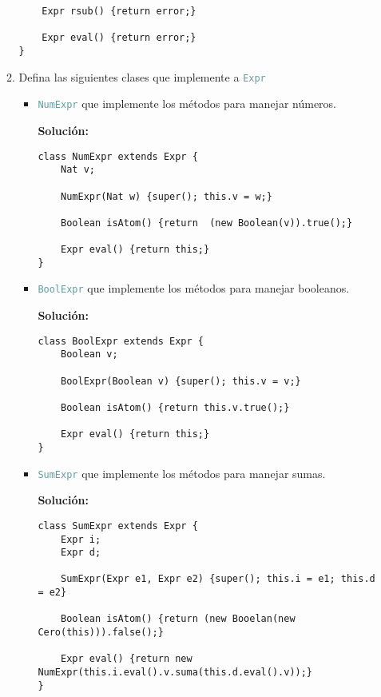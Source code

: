 \documentclass{article}
\newcommand{\tp}[1]{\textcolor{CadetBlue} {\texttt{#1}}}
\newcommand{\tb}[1]{\textcolor{RoyalPurple} {\textbf{#1}}}
\begin{document}
\begin{enumerate}
\begin{enumerate}
\begin{verbatim}
    Expr rsub() {return error;}

    Expr eval() {return error;}
}
            \end{verbatim}

            \item Defina las siguientes clases que implemente a \tp{Expr}

            \begin{itemize}
                \item \tp{NumExpr} que implemente los métodos para manejar
                números.

                \tb{Solución:}

                \begin{verbatim}
class NumExpr extends Expr {
    Nat v;

    NumExpr(Nat w) {super(); this.v = w;}

    Boolean isAtom() {return  (new Boolean(v)).true();}

    Expr eval() {return this;}
}
                \end{verbatim}

                \item \tp{BoolExpr} que implemente los métodos para manejar
                booleanos.

                \tb{Solución:}

                \begin{verbatim}
class BoolExpr extends Expr {
    Boolean v;

    BoolExpr(Boolean v) {super(); this.v = v;}

    Boolean isAtom() {return this.v.true();}

    Expr eval() {return this;}
}
                \end{verbatim}

                \item \tp{SumExpr} que implemente los métodos para manejar
                sumas.

                \tb{Solución:}

                \begin{verbatim}
class SumExpr extends Expr {
    Expr i;
    Expr d;

    SumExpr(Expr e1, Expr e2) {super(); this.i = e1; this.d = e2}

    Boolean isAtom() {return (new Booelan(new Cero(this))).false();}

    Expr eval() {return new NumExpr(this.i.eval().v.suma(this.d.eval().v));}
}
                \end{verbatim}


\end{itemize}
\end{enumerate}
\end{enumerate}
\end{document}
